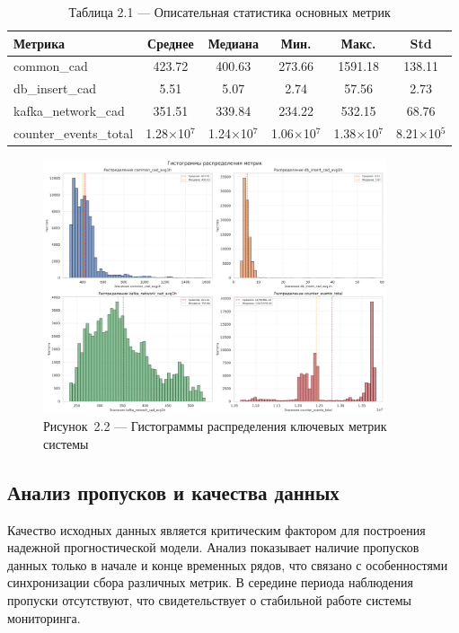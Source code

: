 \begin{table}[H]
	\centering
	\caption*{Таблица 2.1 --- Описательная статистика основных метрик}
	\begin{tabular}{|l|c|c|c|c|c|}
		\hline
		\textbf{Метрика} & \textbf{Среднее} & \textbf{Медиана} & \textbf{Мин.} & \textbf{Макс.} & \textbf{Std} \\
		\hline
		common\_cad & 423.72 & 400.63 & 273.66 & 1591.18 & 138.11 \\
		db\_insert\_cad & 5.51 & 5.07 & 2.74 & 57.56 & 2.73 \\
		kafka\_network\_cad & 351.51 & 339.84 & 234.22 & 532.15 & 68.76 \\
		counter\_events\_total & 1.28$\times$10$^{7}$ & 1.24$\times$10$^{7}$ & 1.06$\times$10$^{7}$ & 1.38$\times$10$^{7}$ & 8.21$\times$10$^{5}$ \\
		\hline
	\end{tabular}
	\label{tab:descriptive_stats}
\end{table}

\begin{figure}[H]
	\centering
	\includegraphics[width=0.9\textwidth]{figures/chapter2/metrics_distribution.png}
	\caption*{Рисунок~2.2 --- Гистограммы распределения ключевых метрик системы}
	\label{fig:metrics_distribution}
\end{figure}

\subsection{Анализ пропусков и качества данных}

\hspace*{1.25cm}Качество исходных данных является критическим фактором для построения надежной прогностической модели. Анализ показывает наличие пропусков данных только в начале и конце временных рядов, что связано с особенностями синхронизации сбора различных метрик. В середине периода наблюдения пропуски отсутствуют, что свидетельствует о стабильной работе системы мониторинга.

